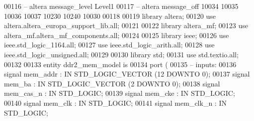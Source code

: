\begin{DoxyCode}
00116 \textcolor{keyword}{-- altera message\_level Level1 }
00117 \textcolor{keyword}{-- altera message\_off 10034 10035 10036 10037 10230 10240 10030 }
00118 
00119 \textcolor{vhdlkeyword}{library }\textcolor{keywordflow}{altera};
00120 \textcolor{vhdlkeyword}{use }altera.altera\_europa\_support\_lib.\textcolor{keywordflow}{all};
00121 
00122 \textcolor{vhdlkeyword}{library }\textcolor{keywordflow}{altera\_mf};
00123 \textcolor{vhdlkeyword}{use }altera_mf.altera\_mf\_components.\textcolor{keywordflow}{all};
00124 
00125 \textcolor{vhdlkeyword}{library }\textcolor{keywordflow}{ieee};
00126 \textcolor{vhdlkeyword}{use }ieee.std\_logic\_1164.\textcolor{keywordflow}{all};
00127 \textcolor{vhdlkeyword}{use }ieee.std\_logic\_arith.\textcolor{keywordflow}{all};
00128 \textcolor{vhdlkeyword}{use }ieee.std\_logic\_unsigned.\textcolor{keywordflow}{all};
00129 
00130 \textcolor{vhdlkeyword}{library }\textcolor{keywordflow}{std};
00131 \textcolor{vhdlkeyword}{use }std.textio.\textcolor{keywordflow}{all};
00132 
00133 \textcolor{keywordflow}{entity }ddr2_mem_model \textcolor{keywordflow}{is} 
00134         \textcolor{keywordflow}{port} \textcolor{vhdlchar}{(}
00135 \textcolor{keyword}{              -- inputs:}
00136                  \textcolor{keywordflow}{signal} \textcolor{vhdlchar}{mem_addr} \textcolor{vhdlchar}{:} \textcolor{keywordflow}{IN} \textcolor{comment}{STD\_LOGIC\_VECTOR} \textcolor{vhdlchar}{(}\textcolor{vhdllogic}{}\textcolor{vhdllogic}{12} \textcolor{keywordflow}{DOWNTO} \textcolor{vhdllogic}{}\textcolor{vhdllogic}{0}\textcolor{vhdlchar}{)};
00137                  \textcolor{keywordflow}{signal} \textcolor{vhdlchar}{mem_ba} \textcolor{vhdlchar}{:} \textcolor{keywordflow}{IN} \textcolor{comment}{STD\_LOGIC\_VECTOR} \textcolor{vhdlchar}{(}\textcolor{vhdllogic}{}\textcolor{vhdllogic}{2} \textcolor{keywordflow}{DOWNTO} \textcolor{vhdllogic}{}\textcolor{vhdllogic}{0}\textcolor{vhdlchar}{)};
00138                  \textcolor{keywordflow}{signal} \textcolor{vhdlchar}{mem_cas_n} \textcolor{vhdlchar}{:} \textcolor{keywordflow}{IN} \textcolor{comment}{STD\_LOGIC};
00139                  \textcolor{keywordflow}{signal} \textcolor{vhdlchar}{mem_cke} \textcolor{vhdlchar}{:} \textcolor{keywordflow}{IN} \textcolor{comment}{STD\_LOGIC};
00140                  \textcolor{keywordflow}{signal} \textcolor{vhdlchar}{mem_clk} \textcolor{vhdlchar}{:} \textcolor{keywordflow}{IN} \textcolor{comment}{STD\_LOGIC};
00141                  \textcolor{keywordflow}{signal} \textcolor{vhdlchar}{mem_clk_n} \textcolor{vhdlchar}{:} \textcolor{keywordflow}{IN} \textcolor{comment}{STD\_LOGIC};

\end{DoxyCode}
